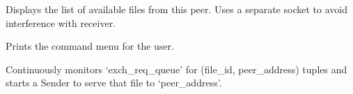 \documentclass[letterpaper,10pt,oneside,english,openany]{sphinxmanual}
\begin{document}

\begin{fulllineitems}
\label{\detokenize{modules:p2p_command.print_index}}
\pysigstartsignatures
\pysiglinewithargsret
{}
{\sphinxparamcomma {}}
{}
\pysigstopsignatures
\sphinxAtStartPar
Displays the list of available files from this peer.
Uses a separate socket to avoid interference with receiver.

\end{fulllineitems}


\begin{fulllineitems}
\label{\detokenize{modules:p2p_command.print_menu}}
\pysigstartsignatures
\pysiglinewithargsret
{}
{}
{}
\pysigstopsignatures
\sphinxAtStartPar
Prints the command menu for the user.

\end{fulllineitems}


\begin{fulllineitems}
\label{\detokenize{modules:p2p_command.process_exchange_requests}}
\pysigstartsignatures
\pysiglinewithargsret
{}
{\sphinxparamcomma {}\sphinxparamcomma {}}
{}
\pysigstopsignatures
\sphinxAtStartPar
Continuously monitors ‘exch\_req\_queue’ for (file\_id, peer\_address) tuples
and starts a Sender to serve that file to ‘peer\_address’.

\end{fulllineitems}

\end{document}
